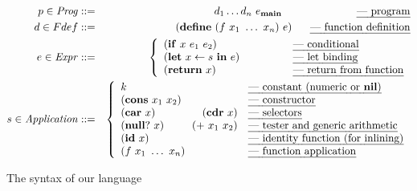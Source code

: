 \begin{figure}[t!]
\footnotesize
\begin{eqnarray*}
   p \in \mathit{Prog} & ::= & d_1 \ldots d_n \,\, e_\mainpgm
    \hspace{7em} \mbox{\em --- program}\\
    d \in Fdef & ::= & (\DEFINE\,\, (f\,\, x_1 \,\, \ldots \,\,x_n)\,\,
    e) 
    \hspace{1.7em} \mbox{\em --- function definition} \\
e \in \mathit{Expr} & ::= &
\left\{\begin{array}{ll@{\hspace{4em}}l}
       (\SIF\,\, x\,\, e_1\,\, e_2) && \mbox{\em --- conditional} \\ 
       (\LET\,\, x \leftarrow s\,\, \IN\,\, e) && \mbox{\em --- let binding} \\
       (\RETURN\,\, x) && \mbox{\em --- return from function}
    \end{array}\right. \\
s \in \mathit{Application} & ::= &
\left\{\begin{array}{lr@{\hspace{1em}}l}
       k && \mbox{\em --- constant (numeric or $\NIL$)}\\
       (\CONS\,\, x_1\,\, x_2) && \mbox{\em --- constructor} \\ 
       (\CAR\,\, x) &  (\CDR\,\, x) & \mbox{\em --- selectors} \\ 
       (\NULLQ\,\, x) & (\PRIM\,\, x_1\,\, x_2) & \mbox{\em ---  tester and generic arithmetic} \\ 
       (\ID\,\, x) && \mbox{\em ---  identity function (for inlining)} \\ 
       \multicolumn{2}{l}{(f\,\, x_1\,\,\ldots\,\, x_n)} 
            & \mbox{\em --- function application} 
    \end{array}\right.
\end{eqnarray*}
  \caption{The syntax of our language}\label{fig:lang-syntax}
\figrule
\normalsize
\end{figure}


